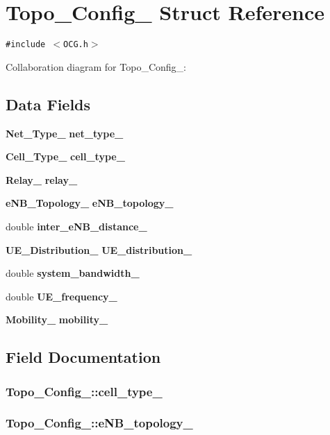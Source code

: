 \section{Topo\_\-Config\_\- Struct Reference}
\label{structTopo__Config__}
{\tt \#include $<$OCG.h$>$}

Collaboration diagram for Topo\_\-Config\_\-:\subsection*{Data Fields}
\begin{CompactItemize}
\item 
{\bf Net\_\-Type\_\-} {\bf net\_\-type\_\-}
\item 
{\bf Cell\_\-Type\_\-} {\bf cell\_\-type\_\-}
\item 
{\bf Relay\_\-} {\bf relay\_\-}
\item 
{\bf eNB\_\-Topology\_\-} {\bf eNB\_\-topology\_\-}
\item 
double {\bf inter\_\-eNB\_\-distance\_\-}
\item 
{\bf UE\_\-Distribution\_\-} {\bf UE\_\-distribution\_\-}
\item 
double {\bf system\_\-bandwidth\_\-}
\item 
double {\bf UE\_\-frequency\_\-}
\item 
{\bf Mobility\_\-} {\bf mobility\_\-}
\end{CompactItemize}


\subsection{Field Documentation}
\subsubsection[{cell\_\-type\_\-}]{ {\bf Topo\_\-Config\_\-::cell\_\-type\_\-}}\label{structTopo__Config___a8960bbffd9cb84aed36f87e77c0901e}


\subsubsection[{eNB\_\-topology\_\-}]{ {\bf Topo\_\-Config\_\-::eNB\_\-topology\_\-}}\label{structTopo__Config___64cdddd5e3103bbf108ccbaa5b0abf5a}


